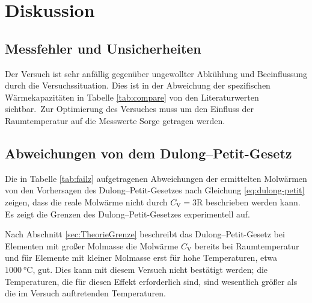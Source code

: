 \section{Diskussion}
\label{sec:Diskussion}
\subsection{Messfehler und Unsicherheiten}
Der Versuch ist sehr anfällig gegenüber ungewollter Abkühlung und Beeinflussung durch die Versuchssituation.
Dies ist in der Abweichung der spezifischen Wärmekapazitäten in Tabelle \ref{tab:compare} von den Literaturwerten sichtbar.\
Zur Optimierung des Versuches muss um den Einfluss der Raumtemperatur auf die Messwerte Sorge getragen werden.

\subsection{Abweichungen von dem Dulong--Petit-Gesetz}
Die in Tabelle \ref{tab:failz} aufgetragenen Abweichungen der ermittelten Molwärmen von den Vorhersagen des Dulong--Petit-Gesetzes nach Gleichung \eqref{eq:dulong-petit} zeigen, dass die reale Molwärme nicht durch $C_\text{V}=3\text{R}$ beschrieben werden kann. 
Es zeigt die Grenzen des Dulong--Petit-Gesetzes experimentell auf.

Nach Abschnitt \ref{sec:TheorieGrenze} beschreibt das Dulong--Petit-Gesetz bei Elementen mit großer Molmasse die Molwärme $C_\text{V}$ bereits bei Raumtemperatur und für Elemente mit kleiner Molmasse erst für hohe Temperaturen, etwa $\SI{1000}{\degreeCelsius}$, gut. 
Dies kann mit diesem Versuch nicht bestätigt werden;
die Temperaturen, die für diesen Effekt erforderlich sind, sind wesentlich größer als die im Versuch auftretenden Temperaturen.